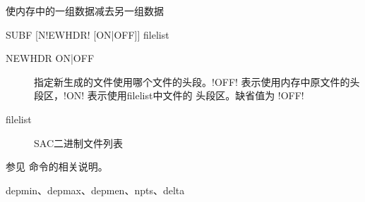 \label{cmd:subf}

使内存中的一组数据减去另一组数据

\begin{SACSTX}
SUBF [N!EWHDR! [ON|OFF]] filelist
\end{SACSTX}

\begin{description}
\item [NEWHDR ON|OFF] 指定新生成的文件使用哪个文件的头段。!OFF!
    表示使用内存中原文件的头段区，!ON! 表示使用filelist中文件的
    头段区。缺省值为 !OFF!
\item [filelist] SAC二进制文件列表
\end{description}

参见  命令的相关说明。

depmin、depmax、depmen、npts、delta
